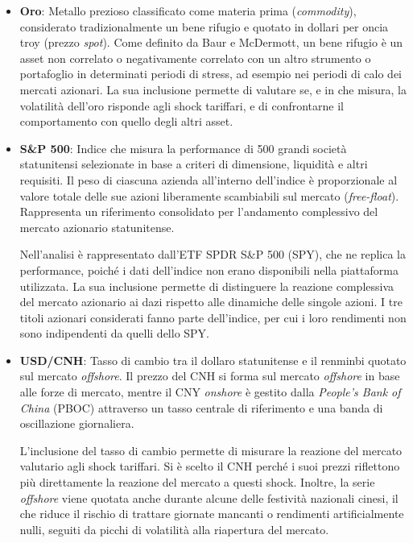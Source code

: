 \begin{itemize}

\item \textbf{Oro}: Metallo prezioso classificato come materia prima (\emph{commodity}), considerato tradizionalmente un bene rifugio e quotato in dollari per oncia troy (prezzo \emph{spot}). 
Come definito da Baur e McDermott\cite{baur:gold}, un bene rifugio è un asset non correlato o negativamente correlato con un altro strumento o portafoglio in determinati 
periodi di stress, ad esempio nei periodi di calo dei mercati azionari. La sua inclusione permette di valutare se, e in che misura, la volatilità 
dell'oro risponde agli shock tariffari, e di confrontarne il comportamento con quello degli altri asset.

\item \textbf{S\&P 500}: Indice che misura la performance di 500 grandi società statunitensi selezionate in base a criteri di dimensione, liquidità e altri requisiti. Il peso di ciascuna azienda 
all'interno dell'indice è proporzionale al valore totale delle sue azioni liberamente scambiabili sul mercato (\emph{\gls{free-float}})\cite{sp:methodology}. Rappresenta un 
riferimento consolidato per l'andamento complessivo del mercato azionario statunitense.

Nell'analisi è rappresentato dall'ETF SPDR S\&P 500 (SPY), che ne replica la performance, poiché i dati dell'indice non erano disponibili nella piattaforma 
utilizzata. La sua inclusione permette di distinguere la reazione complessiva del mercato azionario ai dazi rispetto alle dinamiche delle singole azioni. I tre titoli 
azionari considerati fanno parte dell'indice, per cui i loro rendimenti non sono indipendenti da quelli dello SPY.

\item \textbf{USD/CNH}: Tasso di cambio tra il dollaro statunitense e il renminbi quotato sul mercato \emph{offshore}. Il prezzo del CNH si forma sul mercato \emph{offshore} in base alle forze di 
mercato, mentre il CNY \emph{onshore} è gestito dalla \emph{People's Bank of China} (PBOC) attraverso un tasso centrale di riferimento e una banda di oscillazione giornaliera\cite{bis:cnh}.

L'inclusione del tasso di cambio permette di misurare la reazione del mercato valutario agli shock tariffari. Si è scelto il CNH perché i suoi prezzi riflettono più 
direttamente la reazione del mercato a questi shock. Inoltre, la serie \emph{offshore} viene quotata anche durante alcune delle festività nazionali cinesi, il che riduce il 
rischio di trattare giornate mancanti o rendimenti artificialmente nulli, seguiti da picchi di volatilità alla riapertura del mercato.


\end{itemize}
